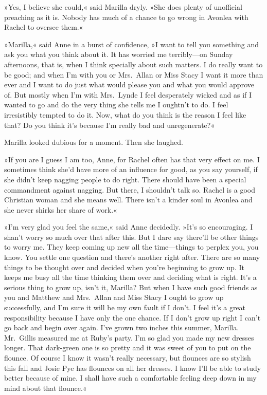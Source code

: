 »Yes, I believe she could,« said Marilla dryly. »She does plenty of unofficial preaching as it is. Nobody has much of a chance to go wrong in Avonlea with Rachel to oversee them.«

»Marilla,« said Anne in a burst of confidence, »I want to tell you something and ask you what you think about it. It has worried me terribly—on Sunday afternoons, that is, when I think specially about such matters. I do really want to be good; and when I'm with you or Mrs.~Allan or Miss Stacy I want it more than ever and I want to do just what would please you and what you would approve of. But mostly when I'm with Mrs.~Lynde I feel desperately wicked and as if I wanted to go and do the very thing she tells me I oughtn't to do. I feel irresistibly tempted to do it. Now, what do you think is the reason I feel like that? Do you think it's because I'm really bad and unregenerate?«

Marilla looked dubious for a moment. Then she laughed.

»If you are I guess I am too, Anne, for Rachel often has that very effect on me. I sometimes think she'd have more of an influence for good, as you say yourself, if she didn't keep nagging people to do right. There should have been a special commandment against nagging. But there, I shouldn't talk so. Rachel is a good Christian woman and she means well. There isn't a kinder soul in Avonlea and she never shirks her share of work.«

»I'm very glad you feel the same,« said Anne decidedly. »It's so encouraging. I shan't worry so much over that after this. But I dare say there'll be other things to worry me. They keep coming up new all the time—things to perplex you, you know. You settle one question and there's another right after. There are so many things to be thought over and decided when you're beginning to grow up. It keeps me busy all the time thinking them over and deciding what is right. It's a serious thing to grow up, isn't it, Marilla? But when I have such good friends as you and Matthew and Mrs.~Allan and Miss Stacy I ought to grow up successfully, and I'm sure it will be my own fault if I don't. I feel it's a great responsibility because I have only the one chance. If I don't grow up right I can't go back and begin over again. I've grown two inches this summer, Marilla. Mr.~Gillis measured me at Ruby's party. I'm so glad you made my new dresses longer. That dark-green one is so pretty and it was sweet of you to put on the flounce. Of course I know it wasn't really necessary, but flounces are so stylish this fall and Josie Pye has flounces on all her dresses. I know I'll be able to study better because of mine. I shall have such a comfortable feeling deep down in my mind about that flounce.«


